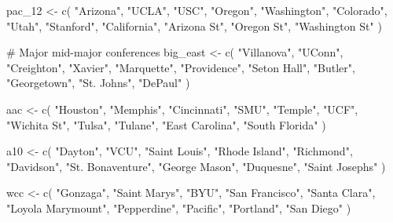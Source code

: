 \documentclass[
  letterpaper,
  DIV=11,
  numbers=noendperiod]{scrartcl}
\newenvironment{Shaded}{\begin{snugshade}}{\end{snugshade}}
\newcommand{\CommentTok}[1]{\textcolor[rgb]{0.37,0.37,0.37}{#1}}
\newcommand{\FunctionTok}[1]{\textcolor[rgb]{0.28,0.35,0.67}{#1}}
\newcommand{\NormalTok}[1]{\textcolor[rgb]{0.00,0.23,0.31}{#1}}
\newcommand{\OtherTok}[1]{\textcolor[rgb]{0.00,0.23,0.31}{#1}}
\newcommand{\StringTok}[1]{\textcolor[rgb]{0.13,0.47,0.30}{#1}}
\begin{document}
\begin{Shaded}
\begin{Highlighting}[]
\NormalTok{    pac\_12 }\OtherTok{\textless{}{-}} \FunctionTok{c}\NormalTok{(}
        \StringTok{"Arizona"}\NormalTok{, }\StringTok{"UCLA"}\NormalTok{, }\StringTok{"USC"}\NormalTok{, }\StringTok{"Oregon"}\NormalTok{, }\StringTok{"Washington"}\NormalTok{, }\StringTok{"Colorado"}\NormalTok{,}
        \StringTok{"Utah"}\NormalTok{, }\StringTok{"Stanford"}\NormalTok{, }\StringTok{"California"}\NormalTok{, }\StringTok{"Arizona St"}\NormalTok{, }\StringTok{"Oregon St"}\NormalTok{,}
        \StringTok{"Washington St"}
\NormalTok{    )}

    \CommentTok{\# Major mid{-}major conferences}
\NormalTok{    big\_east }\OtherTok{\textless{}{-}} \FunctionTok{c}\NormalTok{(}
        \StringTok{"Villanova"}\NormalTok{, }\StringTok{"UConn"}\NormalTok{, }\StringTok{"Creighton"}\NormalTok{, }\StringTok{"Xavier"}\NormalTok{, }\StringTok{"Marquette"}\NormalTok{, }\StringTok{"Providence"}\NormalTok{,}
        \StringTok{"Seton Hall"}\NormalTok{, }\StringTok{"Butler"}\NormalTok{, }\StringTok{"Georgetown"}\NormalTok{, }\StringTok{"St. John\textquotesingle{}s"}\NormalTok{, }\StringTok{"DePaul"}
\NormalTok{    )}

\NormalTok{    aac }\OtherTok{\textless{}{-}} \FunctionTok{c}\NormalTok{(}
        \StringTok{"Houston"}\NormalTok{, }\StringTok{"Memphis"}\NormalTok{, }\StringTok{"Cincinnati"}\NormalTok{, }\StringTok{"SMU"}\NormalTok{, }\StringTok{"Temple"}\NormalTok{, }\StringTok{"UCF"}\NormalTok{, }\StringTok{"Wichita St"}\NormalTok{,}
        \StringTok{"Tulsa"}\NormalTok{, }\StringTok{"Tulane"}\NormalTok{, }\StringTok{"East Carolina"}\NormalTok{, }\StringTok{"South Florida"}
\NormalTok{    )}

\NormalTok{    a10 }\OtherTok{\textless{}{-}} \FunctionTok{c}\NormalTok{(}
        \StringTok{"Dayton"}\NormalTok{, }\StringTok{"VCU"}\NormalTok{, }\StringTok{"Saint Louis"}\NormalTok{, }\StringTok{"Rhode Island"}\NormalTok{, }\StringTok{"Richmond"}\NormalTok{, }\StringTok{"Davidson"}\NormalTok{,}
        \StringTok{"St. Bonaventure"}\NormalTok{, }\StringTok{"George Mason"}\NormalTok{, }\StringTok{"Duquesne"}\NormalTok{, }\StringTok{"Saint Joseph\textquotesingle{}s"}
\NormalTok{    )}

\NormalTok{    wcc }\OtherTok{\textless{}{-}} \FunctionTok{c}\NormalTok{(}
        \StringTok{"Gonzaga"}\NormalTok{, }\StringTok{"Saint Mary\textquotesingle{}s"}\NormalTok{, }\StringTok{"BYU"}\NormalTok{, }\StringTok{"San Francisco"}\NormalTok{, }\StringTok{"Santa Clara"}\NormalTok{,}
        \StringTok{"Loyola Marymount"}\NormalTok{, }\StringTok{"Pepperdine"}\NormalTok{, }\StringTok{"Pacific"}\NormalTok{, }\StringTok{"Portland"}\NormalTok{, }\StringTok{"San Diego"}
\NormalTok{    )}


\end{Highlighting}
\end{Shaded}
\end{document}
